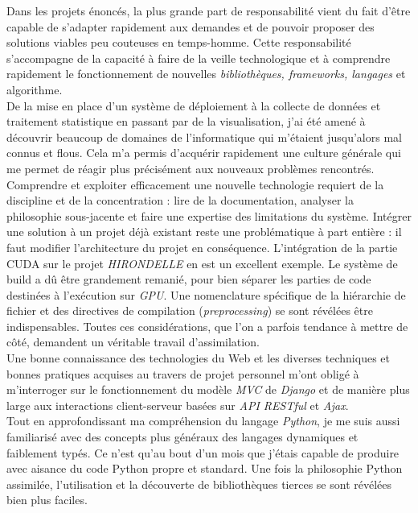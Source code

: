 \documentclass[french, 11pt]{memoir}
\begin{document}
Dans les projets énoncés, la plus grande part de responsabilité vient du
fait d'être capable de s'adapter rapidement aux demandes et de pouvoir
proposer des solutions viables peu couteuses en temps-homme. Cette
responsabilité s'accompagne de la capacité à faire de la veille
technologique et à comprendre rapidement le fonctionnement de nouvelles
\emph{bibliothèques, frameworks, langages} et algorithme. \\ 
De la mise en
place d'un système de déploiement à la collecte de données et traitement
statistique en passant par de la visualisation, j'ai été amené à
découvrir beaucoup de domaines de l'informatique qui m'étaient
jusqu'alors mal connus et flous. Cela m'a permis d'acquérir rapidement
une culture générale qui me permet de réagir plus précisément aux
nouveaux problèmes rencontrés.\\
Comprendre et exploiter efficacement une nouvelle technologie requiert
de la discipline et de la concentration : lire de la documentation,
analyser la philosophie sous-jacente et faire une expertise des
limitations du système. Intégrer une solution à un projet déjà existant
reste une problématique à part entière : il faut modifier l'architecture
du projet en conséquence. L'intégration de la partie CUDA sur le projet
\emph{HIRONDELLE} en est un excellent exemple. Le système de build a dû
être grandement remanié, pour bien séparer les parties de code destinées
à l'exécution sur \emph{GPU}. Une nomenclature spécifique de la
hiérarchie de fichier et des directives de compilation
(\emph{preprocessing}) se sont révélées être indispensables. Toutes ces
considérations, que l'on a parfois tendance à mettre de côté, demandent
un véritable travail d'assimilation. \\
Une bonne connaissance des
technologies du Web et les diverses techniques et bonnes pratiques
acquises au travers de projet personnel m'ont obligé à m'interroger sur
le fonctionnement du modèle \emph{MVC} de \emph{Django} et de manière
plus large aux interactions client-serveur basées sur \textit{API RESTful} et
\emph{Ajax}.\\ Tout en approfondissant ma compréhension du langage
\emph{Python}, je me suis aussi familiarisé avec des concepts plus
généraux des langages dynamiques et faiblement typés. Ce n'est qu'au bout
d'un mois que j'étais capable de produire avec aisance du code Python
propre et standard. Une fois la philosophie Python assimilée,
l'utilisation et la découverte de bibliothèques tierces se sont révélées
bien plus faciles.
\end{document}
